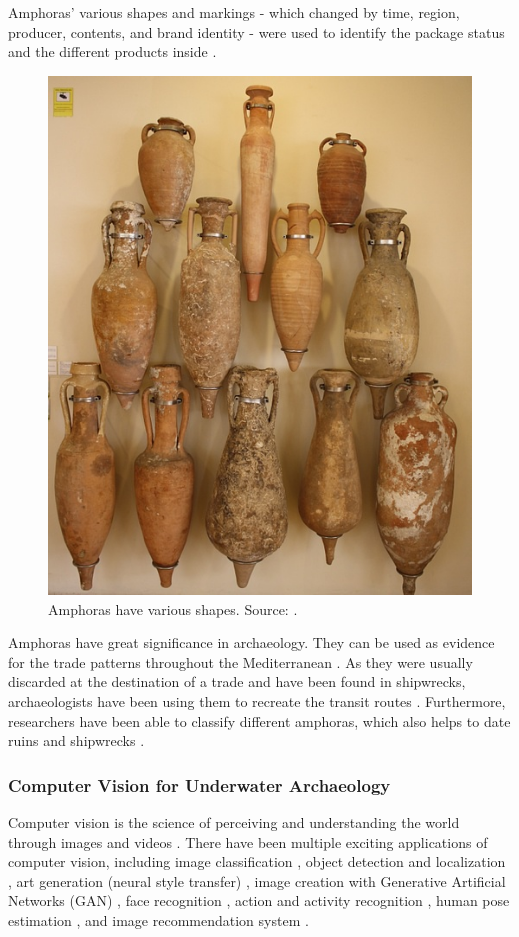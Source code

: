 \documentclass[a4paper, 11pt, oneside]{article}
\begin{document}
  Amphoras' various shapes and markings - which changed by time, region, producer, contents, and brand
  identity - were used to identify the package status and the different products inside \cite{twede2002commercial}.

  \begin{figure}[ht]
    \begin{center}
      \includegraphics[width=.5\textwidth]{amphora_various_shapes.jpg}
    \end{center}
    \caption{Amphoras have various shapes. Source: \cite{worldhistory}.}
    \label{fig:amphora}
  \end{figure}

  Amphoras have great significance in archaeology. They can be used as evidence for the trade patterns throughout
  the Mediterranean \cite{twede2002commercial}. As they were usually discarded at the destination of a trade and have been
  found in shipwrecks, archaeologists have been using them to recreate the transit routes \cite{twede2002commercial}.
  Furthermore, researchers have been able to classify different amphoras, which also helps to date ruins and shipwrecks
  \cite{twede2002commercial}.

  \subsubsection{Computer Vision for Underwater Archaeology}

  \label{sec:cvForUnderwater}

  Computer vision is the science of perceiving and understanding the world through images and videos \cite{elgendy2020deep}.
  There have been multiple exciting applications of computer vision, including image classification \cite{rawat2017deep},
  object detection and localization \cite{zhao2019object,liu2020deep}, art generation (neural style transfer)
  \cite{jing2019neural}, image creation with Generative Artificial Networks (GAN) \cite{goodfellow2014generative},
  face recognition \cite{parkhi2015deep}, action and activity recognition \cite{poppe2010survey}, human pose estimation
  \cite{toshev2014deeppose}, and image recommendation system \cite{niu2018neural}.
\end{document}
